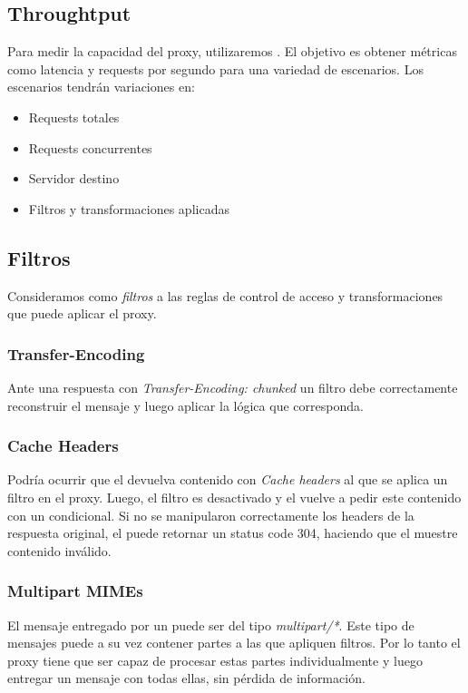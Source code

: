 \documentclass[11pt,a4paper,titlepage]{article}
\begin{document}

\subsection{Throughtput}
Para medir la capacidad del proxy, utilizaremos .
El objetivo es obtener métricas como latencia y requests por segundo para una variedad de escenarios.
Los escenarios tendrán variaciones en:
\begin{itemize}
    \item Requests totales
    \item Requests concurrentes
    \item Servidor destino
    \item Filtros y transformaciones aplicadas
\end{itemize}

\subsection{Filtros}
Consideramos como \textit{filtros} a las reglas de control de acceso y transformaciones que puede aplicar el proxy.

\subsubsection{Transfer-Encoding}
Ante una respuesta con \textit{Transfer-Encoding: chunked} un filtro debe correctamente reconstruir el mensaje y luego aplicar la lógica que corresponda.

\subsubsection{Cache Headers}
Podría ocurrir que el \os devuelva contenido con \textit{Cache headers} al que se aplica un filtro en el proxy.
Luego, el filtro es desactivado y el \ua vuelve a pedir este contenido con un  condicional.
Si no se manipularon correctamente los headers de la respuesta original, el \os puede retornar un status code 304, haciendo que el \ua muestre contenido inválido.

\subsubsection{Multipart MIMEs}
El mensaje entregado por un \os puede ser del tipo \textit{multipart/*}.
Este tipo de mensajes puede a su vez contener partes a las que apliquen filtros.
Por lo tanto el proxy tiene que ser capaz de procesar estas partes individualmente y luego entregar un mensaje con todas ellas, sin pérdida de información.

\end{document}
